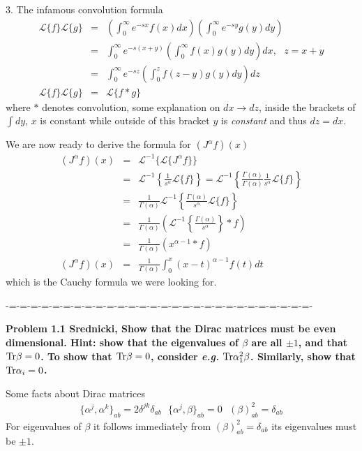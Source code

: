 \documentclass[aps,preprint,preprintnumbers,nofootinbib,showpacs,prd]{revtex4-1}
\newcommand{\eg}{{\it e.g.} }
\newcommand{\nbea}{\begin{eqnarray*}}
\newcommand{\neea}{\end{eqnarray*}}
\begin{document}
3. The infamous convolution formula 
\nbea
\mathcal{L}\{f\}\mathcal{L}\{g\} & = & \left (\int_0^\infty e^{-sx} f(x) dx\right )\left (\int_0^\infty e^{-sy} g(y) dy\right ) \\
& = & \int_0^\infty e^{-s(x+y)}  \left ( \int_0^{\infty} f(x) g(y) dy \right ) dx, ~~~ z = x + y \\
& = & \int_0^\infty e^{-s z} \left ( \int_0^{z} f(z-y) g(y) dy \right ) dz \\
\mathcal{L}\{f\}\mathcal{L}\{g\} & = & \mathcal{L} \{ f * g\}
\neea
where $*$ denotes convolution, some explanation on $dx \rightarrow dz$, inside the brackets of $\int dy$, $x$ is constant while outside of this bracket $y$ is {\it constant} and thus $dz = dx$.
 
We are now ready to derive the formula for $(J^\alpha f)(x)$
\nbea
(J^\alpha f)(x) & = & \mathcal{L}^{-1} \{ \mathcal{L} \{J^\alpha f\} \} \\
& = & \mathcal{L}^{-1} \left \{ \frac{1}{s^\alpha} \mathcal{L} \{ f\} \right \} = \mathcal{L}^{-1} \left \{ \frac{\Gamma(\alpha)}{\Gamma(\alpha)}\frac{1}{s^\alpha} \mathcal{L} \{ f\} \right \} \\
& = & \frac{1}{\Gamma(\alpha)}\mathcal{L}^{-1} \left \{ \frac{\Gamma(\alpha)}{s^\alpha} \mathcal{L} \{ f\} \right \} \\
& = & \frac{1}{\Gamma(\alpha)} \left ( \mathcal{L}^{-1} \left \{ \frac{\Gamma(\alpha)}{s^\alpha} \right \} *  f \right ) \\
& = & \frac{1}{\Gamma(\alpha)} \left ( x^{\alpha-1} *  f \right ) \\
(J^\alpha f)(x) & = & \frac{1}{\Gamma(\alpha)} \int_0^x ( x - t )^{\alpha-1}  f(t) dt 
\neea
which is the Cauchy formula we were looking for.

-=-=-=-=-=-=-=-=-=-=-=-=-=-=-=-=-=-=-=-=-=-=-=-=-=-=-=-=-

{\bf Problem 1.1 Srednicki, Show that the Dirac matrices must be even dimensional. Hint: show that the eigenvalues of $\beta$ are all $\pm 1$, and that ${\rm Tr} \beta = 0$. To show that ${\rm Tr} \beta = 0$, consider \eg ${\rm Tr} \alpha_1^2 \beta$. Similarly, show that ${\rm Tr} \alpha_i = 0$.}

Some facts about Dirac matrices
%
\nbea
\{ \alpha^j, \alpha^k\}_{ab} = 2\delta^{jk}\delta_{ab} ~~~ \{ \alpha^j, \beta\}_{ab} = 0 ~~~ (\beta)^2_{ab} = \delta_{ab}
\neea
%
For eigenvalues of $\beta$ it follows immediately from $(\beta)^2_{ab} = \delta_{ab}$ its eigenvalues must be $\pm 1$.
\end{document}

